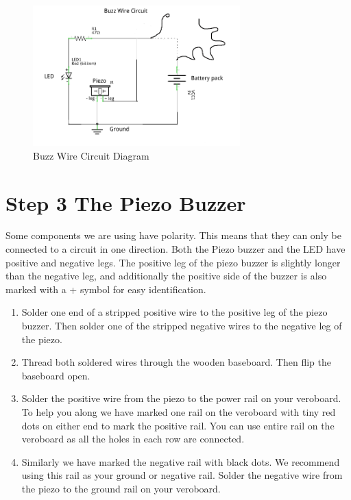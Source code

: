 %
\begin{figure}[ht]
	\centering
	\includegraphics[width=8cm]{images/circuit_diagram}
	\caption{Buzz Wire Circuit Diagram}
	\label{fig:circuit_diagram}
\end{figure}
%


%
\section*{Step 3 The Piezo Buzzer}

Some components we are using have polarity. This means that they can only be connected to a circuit in one direction. Both the Piezo buzzer and the LED have positive and negative legs. The positive leg of the piezo buzzer is slightly longer than the negative leg, and additionally the positive side of the buzzer is also marked with a + symbol for easy identification.

\begin{enumerate}
	\item Solder one end of a stripped positive wire to the positive leg of the piezo buzzer. Then solder one of the stripped negative wires to the negative leg of the piezo.
	
	\item Thread both soldered wires through the wooden baseboard. Then flip the baseboard open.
	
	\item Solder the positive wire from the piezo to the power rail on your veroboard. To help you along we have marked one rail on the veroboard with tiny red dots on either end to mark the positive rail. You can use entire rail on the veroboard as all the holes in each row are connected.
	
	\item Similarly we have marked the negative rail with black dots. We recommend using this rail as your ground or negative rail. Solder the negative wire from the piezo to the ground rail on your veroboard.
\end{enumerate}

